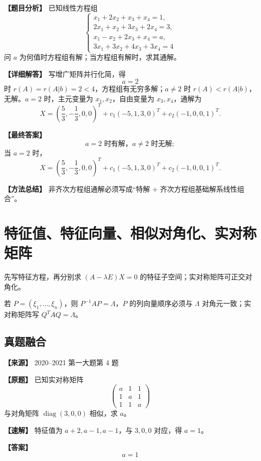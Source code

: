 \documentclass[11pt,a4paper,UTF8]{ctexart}
\newcommand{\diag}{\operatorname{diag}}
\begin{document}
\begin{answerbox}
\textbf{【题目分析】} 已知线性方程组
\[
\begin{cases}
x_1+2x_2+x_3+x_4=1,\\
2x_1+x_2+3x_3+2x_4=3,\\
x_1-x_2+2x_3+x_4=a,\\
3x_1+3x_2+4x_3+3x_4=4
\end{cases}
\]
问 $a$ 为何值时方程组有解；当方程组有解时，求其通解。

\textbf{【详细解答】} 写增广矩阵并行化简，得
\[
a=2
\]
时 $r(A)=r(A|b)=2<4$，方程组有无穷多解；$a\ne2$ 时 $r(A)<r(A|b)$，无解。$a=2$ 时，主元变量为 $x_1,x_2$，自由变量为 $x_3,x_4$，通解为
\[
X=\left(\frac53,-\frac13,0,0\right)^T
+c_1(-5,1,3,0)^T+c_2(-1,0,0,1)^T.
\]

\textbf{【最终答案】}
\[
a=2\text{ 时有解，}a\ne2\text{ 时无解};
\]
当 $a=2$ 时，
\[
X=
\left(\frac53,-\frac13,0,0\right)^T
+c_1(-5,1,3,0)^T
+c_2(-1,0,0,1)^T.
\]

\textbf{【方法总结】} 非齐次方程组通解必须写成“特解 + 齐次方程组基础解系线性组合”。
\end{answerbox}


\section{特征值、特征向量、相似对角化、实对称矩阵}

\begin{identifybox}[识别]
先写特征方程，再分别求 $(A-\lambda E)X=0$ 的特征子空间；实对称矩阵可正交对角化。
\end{identifybox}
\begin{templatebox}[考场模板]
若 $P=(\xi_1,\ldots,\xi_n)$，则 $P^{-1}AP=\Lambda$，$P$ 的列向量顺序必须与 $\Lambda$ 对角元一致；实对称矩阵写 $Q^TAQ=\Lambda$。
\end{templatebox}

\subsection{真题融合}

\begin{answerbox}
\textbf{【来源】} 2020--2021 第一大题第 4 题

\textbf{【原题】}
已知实对称矩阵
\[
\begin{pmatrix}a&1&1\\1&a&1\\1&1&a\end{pmatrix}
\]
与对角矩阵 $\diag(3,0,0)$ 相似，求 $a$。

\textbf{【速解】}
特征值为 $a+2,a-1,a-1$，与 $3,0,0$ 对应，得 $a=1$。

\textbf{【答案】}
\[a=1\]
\end{answerbox}
\end{document}
